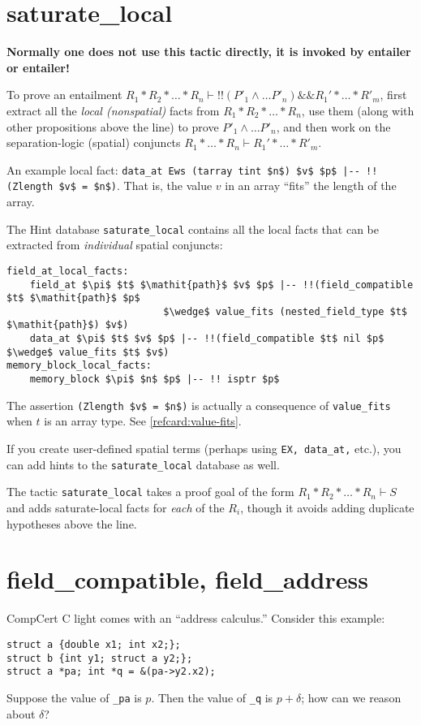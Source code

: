 \documentclass[12pt,fleqn,openany,oneside,showtrims]{memoir}
\begin{document}
\chapter{saturate\_local}
\label{refcard:saturate-local}
\textbf{Normally one does not use this tactic directly,
  it is invoked by \textsf{entailer} or \textsf{entailer!}}

To prove an entailment $R_1*R_2*\ldots*R_n \vdash
!!(P'_1 \wedge \ldots P'_n) \&\& R_1'*\ldots*R'_m$,
first extract all the \emph{local (nonspatial)} facts from
$R_1*R_2*\ldots*R_n$, use them (along with other propositions
above the line) to prove $P'_1 \wedge \ldots P'_n$,
and then work on the separation-logic (spatial) conjuncts
$R_1*\ldots*R_n \vdash R_1'*\ldots*R'_m$.

An example local fact:
\lstinline{data_at Ews (tarray tint $n$) $v$ $p$ |-- !! (Zlength $v$ = $n$)}.
That is, the value $v$ in an array ``fits'' the length of the array.

The Hint database \lstinline{saturate_local} contains all the
local facts that can be extracted from \emph{individual} spatial conjuncts:
\begin{lstlisting}
field_at_local_facts:
    field_at $\pi$ $t$ $\mathit{path}$ $v$ $p$ |-- !!(field_compatible $t$ $\mathit{path}$ $p$
                           $\wedge$ value_fits (nested_field_type $t$ $\mathit{path}$) $v$)
    data_at $\pi$ $t$ $v$ $p$ |-- !!(field_compatible $t$ nil $p$ $\wedge$ value_fits $t$ $v$)
memory_block_local_facts:
    memory_block $\pi$ $n$ $p$ |-- !! isptr $p$
\end{lstlisting}
The assertion \lstinline{(Zlength $v$ = $n$)} is actually a consequence
of \lstinline{value_fits} when $t$ is an array type.
See \autoref{refcard:value-fits}.

If you create user-defined spatial terms (perhaps using
\lstinline{EX, data_at,} etc.), you can add hints to
the \lstinline{saturate_local} database as well.

The tactic \lstinline{saturate_local} takes a proof goal of the
form $R_1*R_2*\ldots*R_n \vdash S$ and adds
saturate-local facts for \emph{each} of the $R_i$,
though it avoids adding duplicate hypotheses above the line.

\chapter{field\_compatible, field\_address}
\label{refcard:field-compatible}
\label{refcard:field-address}
CompCert C light comes with an ``address calculus.''
Consider this example:
\begin{lstlisting}
struct a {double x1; int x2;};
struct b {int y1; struct a y2;};
struct a *pa; int *q = &(pa->y2.x2);
\end{lstlisting}
Suppose the value of \lstinline{_pa} is $p$.
Then the value of \lstinline{_q} is $p+\delta$;
how can we reason about $\delta$?
\end{document}
